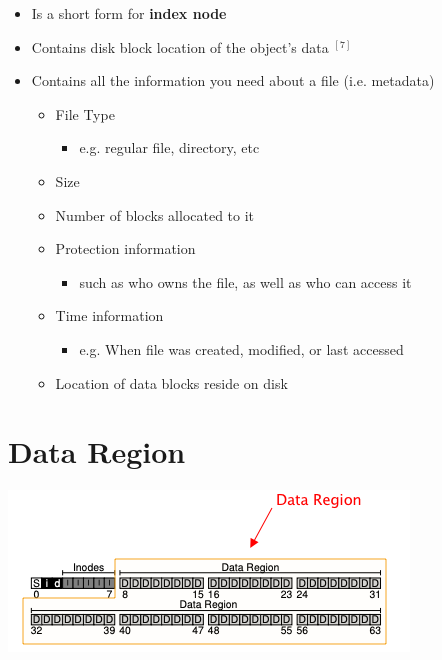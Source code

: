 \documentclass[12pt]{article}
\begin{document}
\begin{itemize}
    \item Is a short form for \textbf{index node}
    \item Contains disk block location of the object's data $^{[7]}$
    \item Contains all the information you need about a file (i.e. metadata)

    \begin{itemize}
        \item File Type
        \begin{itemize}
            \item e.g. regular file, directory, etc
        \end{itemize}
        \item Size
        \item Number of blocks allocated to it
        \item Protection information
        \begin{itemize}
            \item such as who owns the file, as well as who can access it
        \end{itemize}
        \item Time information
        \begin{itemize}
            \item e.g. When file was created, modified, or last accessed
        \end{itemize}
        \item Location of data blocks reside on disk
    \end{itemize}
\end{itemize}

\section*{Data Region}

\begin{center}
\includegraphics[width=\linewidth]{images/midterm_1_solution_11.png}
\end{center}
\end{document}
